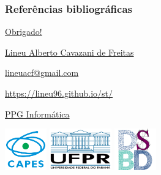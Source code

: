 \documentclass[10pt,
  aspectratio=169,
  serif,
  mathserif,
  professionalfont,
  compress,
  handout,
  ]{beamer}\usepackage[]{graphicx}\usepackage[]{color}
\begin{document}

\begin{frame}[c, allowframebreaks]
  \frametitle{Referências bibliográficas}
  
  \begin{tiny}
    
  \end{tiny}
  
\end{frame}

\begin{frame}[c, allowframebreaks]

\begin{center}

  {\huge \href{https://lineu96.github.io/st/}{Obrigado!}}
  
  \vspace{0.5cm}
    
  {\normalsize \href{https://lineu96.github.io/st/}{Lineu Alberto Cavazani de Freitas}}
  
  {\normalsize \href{https://lineu96.github.io/st/}{lineuacf@gmail.com}}
  
  {\normalsize \href{https://lineu96.github.io/st/}{https://lineu96.github.io/st/}}
  
  {\normalsize \href{http://www.prppg.ufpr.br/ppginformatica/?lang=pb}{PPG Informática}}

\end{center}

\begin{center}
  \includegraphics[height=1.8cm]{img/capes_tp2.png}\hspace{2em}
  \includegraphics[height=1.8cm]{img/ufpr-transparent.png}\hspace{2em}
  \includegraphics[height=1.8cm]{img/dsbd-2x2-trans.png}
\end{center}

\end{frame}

\end{document}
